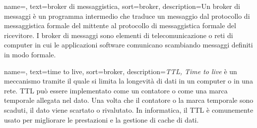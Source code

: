 {
    name=,
    text=broker di messaggistica,
    sort=broker,
    description={Un broker di messaggi è un programma intermedio
che traduce un messaggio dal protocollo di messaggistica formale del mittente al
protocollo di messaggistica formale del ricevitore. I broker di messaggi sono elementi
di telecomunicazione o reti di computer in cui le applicazioni software comunicano
scambiando messaggi definiti in modo formale.}
}

{
    name=,
    text=time to live,
    sort=broker,
    description={\emph{TTL, Time to live} è un meccanismo tramite il quale si limita la longevità di dati in un computer o in una rete. TTL può essere implementato come un contatore o come una marca temporale allegata nel dato. Una volta che il contatore o la marca temporale sono scaduti, il dato viene scartato o rivalutato. In informatica, il TTL è comunemente usato per migliorare le prestazioni e la gestione di cache di dati.}
}


